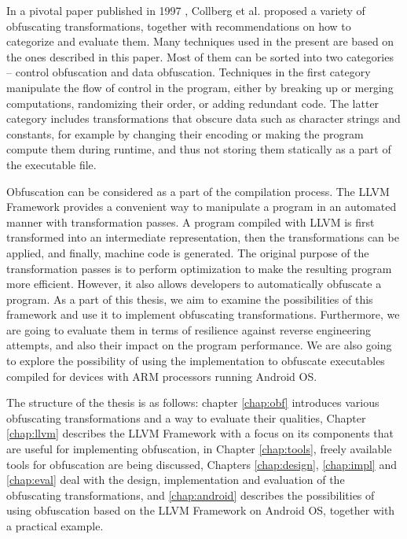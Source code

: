 \documentclass[
  digital, %
  notable,   %
  twoside, %
  nolof,     %
  nolot,     %
]{fithesis3}
\theoremstyle{definition}
\begin{document}
In a pivotal paper published in 1997 \cite{taxonomy_obf}, Collberg et al. proposed a variety of obfuscating transformations, together with recommendations on how to categorize and evaluate them. Many techniques used in the present are based on the ones described in this paper. Most of them can be sorted into two categories -- control obfuscation and data obfuscation. Techniques in the first category manipulate the flow of control in the program, either by breaking up or merging computations, randomizing their order, or adding redundant code. The latter category includes transformations that obscure data such as character strings and constants, for example by changing their encoding or making the program compute them during runtime, and thus not storing them statically as a part of the executable file.

Obfuscation can be considered as a part of the compilation process. The LLVM Framework \cite{llvm_orig} provides a convenient way to manipulate a program in an automated manner with transformation passes. A program compiled with LLVM is first transformed into an intermediate representation, then the transformations can be applied, and finally, machine code is generated. The original purpose of the transformation passes is to perform optimization to make the resulting program more efficient. However, it also allows developers to automatically obfuscate a program. As a part of this thesis, we aim to examine the possibilities of this framework and use it to implement obfuscating transformations. Furthermore, we are going to evaluate them in terms of resilience against reverse engineering attempts, and also their impact on the program performance. We are also going to explore the possibility of using the implementation to obfuscate executables compiled for devices with ARM processors running Android OS. 

The structure of the thesis is as follows: chapter \ref{chap:obf} introduces various obfuscating transformations and a way to evaluate their qualities, Chapter \ref{chap:llvm} describes the LLVM Framework with a focus on its components that are useful for implementing obfuscation, in Chapter \ref{chap:tools}, freely available tools for obfuscation are being discussed, Chapters \ref{chap:design}, \ref{chap:impl} and \ref{chap:eval} deal with the design, implementation and evaluation of the obfuscating transformations, and \ref{chap:android} describes the possibilities of using obfuscation based on the LLVM Framework on Android OS, together with a practical example. 
\end{document}
